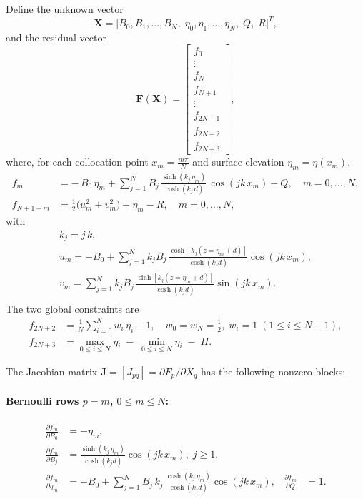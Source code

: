 \documentclass{article}
\begin{document}
Define the unknown vector
\[
\mathbf{X} = \bigl[B_{0}, B_{1},\dots,B_{N},\;\eta_{0},\eta_{1},\dots,\eta_{N},\;Q,\;R\bigr]^{T},
\]
and the residual vector
\[
\mathbf{F}(\mathbf{X}) =
\begin{bmatrix}
f_{0}\\
\vdots\\
f_{N}\\[0.5ex]
f_{N+1}\\
\vdots\\
f_{2N+1}\\[0.5ex]
f_{2N+2}\\
f_{2N+3}
\end{bmatrix},
\]
where, for each collocation point \(x_{m} = \tfrac{m\pi}{N}\) and surface elevation \(\eta_{m} = \eta(x_{m})\),
\begin{align}
f_{m} &= -\,B_{0}\,\eta_{m}
       + \sum_{j=1}^{N} B_{j}\,\frac{\sinh(k_{j}\,\eta_{m})}{\cosh(k_{j}\,d)}\,\cos(jk\,x_{m})
       + Q,
       \quad m=0,\dots,N,
       \\
f_{N+1+m} &= \tfrac12\bigl(u_{m}^{2}+v_{m}^{2}\bigr)
            + \eta_{m} - R,
       \quad m=0,\dots,N,
\end{align}
with
\begin{align}
k_{j} = j\,k, \\[0.5ex]
u_{m} = -B_{0} + \sum_{j=1}^{N} k_{j}B_{j}\,\frac{\cosh[k_{j}(z=\eta_{m}+d)]}{\cosh(k_{j}d)}\cos(jk\,x_{m}),
 \\[0.5ex]
v_{m} = \sum_{j=1}^{N} k_{j}B_{j}\,\frac{\sinh[k_{j}(z=\eta_{m}+d)]}{\cosh(k_{j}d)}\sin(jk\,x_{m}). \\[0.5ex]
\end{align}
The two global constraints are
\begin{align}
f_{2N+2} &= \frac{1}{N}\sum_{i=0}^{N} w_i\,\eta_{i} - 1,
\quad w_{0}=w_{N}=\tfrac12,\;w_{i}=1\;(1\le i\le N-1),
\\
f_{2N+3} &= \max_{0\le i\le N}\!\eta_{i}\;-\;\min_{0\le i\le N}\!\eta_{i}\;-\;H.
\end{align}

The Jacobian matrix \(\mathbf{J} = [J_{pq}]=\partial F_{p}/\partial X_{q}\) has the following nonzero blocks:

\paragraph{Bernoulli rows \(p=m\), \(0\le m\le N\):}
\begin{align}
\frac{\partial f_{m}}{\partial B_{0}}
  &= -\eta_{m},
  \\[0.5ex]
\frac{\partial f_{m}}{\partial B_{j}}
  &= \frac{\sinh(k_{j}\,\eta_{m})}{\cosh(k_{j}d)}\cos(jk\,x_{m}),\; j\ge1,
  \\
\frac{\partial f_{m}}{\partial \eta_{m}}
  &= -B_{0}
     + \sum_{j=1}^{N}B_{j}\,k_{j}\,\frac{\cosh(k_{j}\,\eta_{m})}{\cosh(k_{j}d)}\cos(jk\,x_{m}),
  &
\frac{\partial f_{m}}{\partial Q}
  &= 1.
\end{align}
\end{document}
